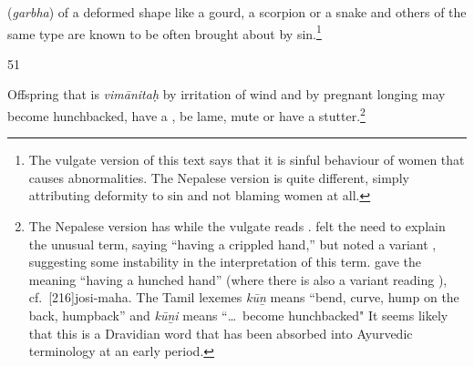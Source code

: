 \begin{translation}
 (\emph{garbha}) of a deformed 
shape like a gourd, a scorpion or a snake and 
others of the same type are known to be often brought about by 
sin.\footnote{The vulgate version of this text says that it is sinful behaviour of 
women that causes abnormalities.  The Nepalese version is quite different, 
simply attributing deformity to sin and not blaming women at all.}

\item [51]

Offspring that is \emph{vimānitaḥ} by irritation
of wind and by pregnant longing may become hunchbacked, have a
, be lame, mute or have a
stutter.\footnote{The Nepalese version has  while the
    vulgate reads .  felt the need to
    explain the unusual term, saying  “having a
    crippled hand,” but \citet[footnote 5]{acar-1939} noted a variant
    , suggesting some instability in the interpretation
    of this term.  gave the meaning 
    “having a hunched hand” (where there is also a variant reading
    ), cf.\ [216]{josi-maha}.   The Tamil
    lexemes\emph{ kū\b n} means “bend, curve, hump on the back, humpback”
    and \emph{kū\b ni} means “\ldots\ become hunchbacked"
    \citep[\#1927]{DED} It seems likely that this is a Dravidian word
    that has been absorbed into Ayurvedic terminology at an early
    period.}

    
%
%
%
%
%
%
%  

\end{translation}
